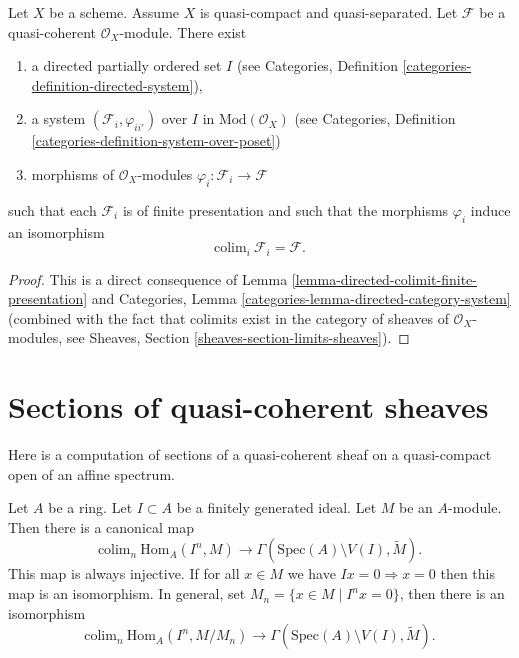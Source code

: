 \begin{lemma}
\label{lemma-directed-colimit-finite-presentation}
Let $X$ be a scheme. Assume $X$ is quasi-compact and quasi-separated.
Let $\mathcal{F}$ be a quasi-coherent $\mathcal{O}_X$-module.
There exist
\begin{enumerate}
\item a directed partially ordered set $I$ (see
Categories, Definition \ref{categories-definition-directed-system}),
\item a system $(\mathcal{F}_i, \varphi_{ii'})$
over $I$ in $\text{Mod}(\mathcal{O}_X)$ (see
Categories, Definition \ref{categories-definition-system-over-poset})
\item morphisms of $\mathcal{O}_X$-modules
$\varphi_i : \mathcal{F}_i \to \mathcal{F}$
\end{enumerate}
such that each $\mathcal{F}_i$ is of finite presentation
and such that the morphisms $\varphi_i$ induce an isomorphism
$$
\text{colim}_i\ \mathcal{F}_i
=
\mathcal{F}.
$$
\end{lemma}

\begin{proof}
This is a direct consequence of
Lemma \ref{lemma-directed-colimit-finite-presentation} and
Categories, Lemma \ref{categories-lemma-directed-category-system}
(combined with the fact that
colimits exist in the category of sheaves of $\mathcal{O}_X$-modules, see 
Sheaves, Section \ref{sheaves-section-limits-sheaves}).
\end{proof}












\section{Sections of quasi-coherent sheaves}
\label{section-sections-quasi-coherent}

\noindent
Here is a computation of sections of a quasi-coherent sheaf on a quasi-compact
open of an affine spectrum.

\begin{lemma}
\label{lemma-sections-over-quasi-compact-open-in-affine}
Let $A$ be a ring.
Let $I \subset A$ be a finitely generated ideal.
Let $M$ be an $A$-module.
Then there is a canonical map
$$
\text{colim}_n\ \text{Hom}_A(I^n, M)
\longrightarrow
\Gamma(\text{Spec}(A) \setminus V(I), \widetilde{M}).
$$
This map is always injective.
If for all $x \in M$ we have $Ix = 0 \Rightarrow x = 0$
then this map is an isomorphism. In general, set
$M_n = \{x \in M \mid I^nx = 0\}$, then there is an
isomorphism
$$
\text{colim}_n\ \text{Hom}_A(I^n, M/M_n)
\longrightarrow
\Gamma(\text{Spec}(A) \setminus V(I), \widetilde{M}).
$$
\end{lemma}

